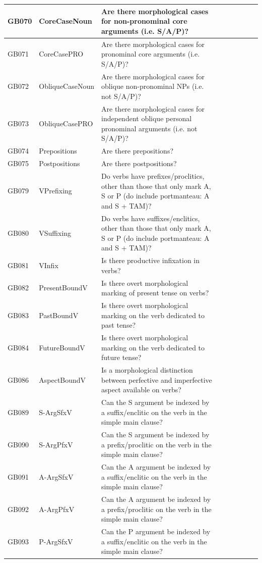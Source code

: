 \documentclass[draft,10pt]{article} %
\begin{document}
\begin{landscape}
\begin{longtable}{| l | p{4cm}| p{12cm}|p{2cm}|p{2cm}|p{2cm}|p{2cm}|p{2cm}|p{2cm}|}
GB070 & CoreCaseNoun&Are there morphological cases for non-pronominal core arguments (i.e. S/A/P)?\\ \hline
GB071 & CoreCasePRO&Are there morphological cases for pronominal core arguments (i.e. S/A/P)?\\ \hline
GB072 & ObliqueCaseNoun&Are there morphological cases for oblique non-pronominal NPs (i.e. not S/A/P)?\\ \hline
GB073 & ObliqueCasePRO&Are there morphological cases for independent oblique personal pronominal arguments (i.e. not S/A/P)?\\ \hline
GB074 & Prepositions&Are there prepositions?\\ \hline
GB075 & Postpositions&Are there postpositions?\\ \hline
GB079 & VPrefixing&Do verbs have prefixes/proclitics, other than those that only mark A, S or P (do include portmanteau: A and S + TAM)?\\ \hline
GB080 & VSuffixing&Do verbs have suffixes/enclitics, other than those that only mark A, S or P (do include portmanteau: A and S + TAM)?\\ \hline
GB081 & VInfix&Is there productive infixation in verbs?\\ \hline
GB082 & PresentBoundV&Is there overt morphological marking of present tense on verbs?\\ \hline
GB083 & PastBoundV&Is there overt morphological marking on the verb dedicated to past tense?\\ \hline
GB084 & FutureBoundV&Is there overt morphological marking on the verb dedicated to future tense?\\ \hline
GB086 & AspectBoundV&Is a morphological distinction between perfective and imperfective aspect available on verbs?\\ \hline
GB089 & S-ArgSfxV&Can the S argument be indexed by a suffix/enclitic on the verb in the simple main clause?\\ \hline
GB090 & S-ArgPfxV&Can the S argument be indexed by a prefix/proclitic on the verb in the simple main clause?\\ \hline
GB091 & A-ArgSfxV&Can the A argument be indexed by a suffix/enclitic on the verb in the simple main clause?\\ \hline
GB092 & A-ArgPfxV&Can the A argument be indexed by a prefix/proclitic on the verb in the simple main clause?\\ \hline
GB093 & P-ArgSfxV&Can the P argument be indexed by a suffix/enclitic on the verb in the simple main clause?\\ \hline

\end{longtable}
\end{landscape}
\end{document}
